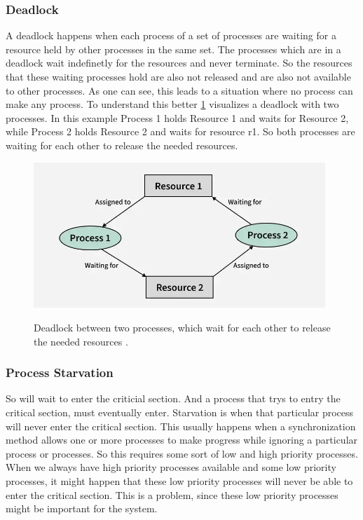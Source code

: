 \subsubsection{Deadlock}\label{subsubsec:deadlock}

A deadlock happens when each process of a set of processes are waiting for a resource held by other processes in the same set. The processes which are in a deadlock wait indefinetly for the resources and never terminate. So the resources that these waiting processes hold are also not released and are also not available to other processes. As one can see, this leads to a situation where no process can make any process. To understand this better \cref{fig:deadlock} visualizes a deadlock with two processes. In this example Process 1 holds Resource 1 and waits for Resource 2, while Process 2 holds Resource 2 and waits for resource r1. So both processes are waiting for each other to release the needed resources. \cite{Deadlock,chahar2013deadlock}

\begin{figure}[!ht]
   \centering
   \captionsetup{justification=centering}
   \caption{Deadlock between two processes, which wait for each other to release the needed resources \cite{Deadlock}.}
   \includegraphics[width=110mm]{images/deadlock.png}
   \label{fig:deadlock}
\end{figure}

\subsubsection{Process Starvation}\label{subsubsec:process-starvation}

So will wait to enter the criticial section. And a process that trys to entry the critical section, must eventually enter. Starvation is when that particular process will never enter the critical section. This usually happens when a synchronization method allows one or more processes to make progress while ignoring a particular process or processes. So this requires some sort of low and high priority processes. When we always have high priority processes available and some low priority processes, it might happen that these low priority processes will never be able to enter the critical section. This is a problem, since these low priority processes might be important for the system. \cite{Starvation}


